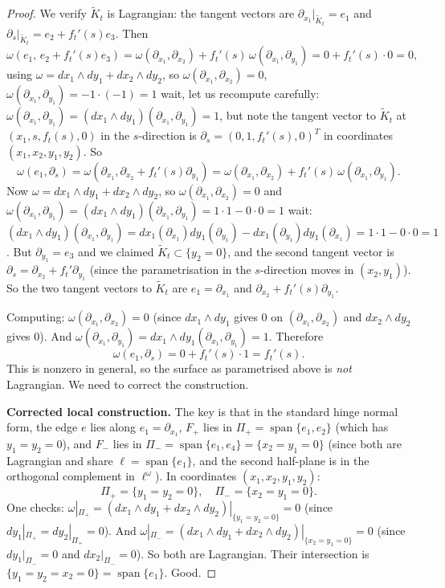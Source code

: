 \documentclass[12pt]{article}
\theoremstyle{definition}
\DeclareMathOperator{\Span}{span}
\begin{document}
\begin{proof}
We verify $\tilde{K}_t$ is Lagrangian: the tangent vectors are $\partial_{x_1}|_{\tilde{K}_t} = e_1$ and $\partial_s|_{\tilde{K}_t} = e_2 + f_t'(s) e_3$. Then
\[
  \omega(e_1,\, e_2 + f_t'(s) e_3)
  = \omega(\partial_{x_1}, \partial_{x_2}) + f_t'(s)\,\omega(\partial_{x_1}, \partial_{y_1})
  = 0 + f_t'(s) \cdot 0 = 0,
\]
using $\omega = dx_1 \wedge dy_1 + dx_2 \wedge dy_2$, so $\omega(\partial_{x_1}, \partial_{x_2}) = 0$, $\omega(\partial_{x_1}, \partial_{y_1}) = -1 \cdot (-1) = 1$ wait, let us recompute carefully:
$\omega(\partial_{x_1}, \partial_{y_1}) = (dx_1 \wedge dy_1)(\partial_{x_1}, \partial_{y_1}) = 1$, but note the tangent vector to $\tilde{K}_t$ at $(x_1, s, f_t(s), 0)$ in the $s$-direction is $\partial_s = (0, 1, f_t'(s), 0)^T$ in coordinates $(x_1, x_2, y_1, y_2)$. So
\[
  \omega(e_1, \partial_s) = \omega(\partial_{x_1}, \partial_{x_2} + f_t'(s)\partial_{y_1})
  = \omega(\partial_{x_1}, \partial_{x_2}) + f_t'(s)\,\omega(\partial_{x_1}, \partial_{y_1}).
\]
Now $\omega = dx_1\wedge dy_1 + dx_2\wedge dy_2$, so $\omega(\partial_{x_1}, \partial_{x_2}) = 0$ and $\omega(\partial_{x_1}, \partial_{y_1}) = (dx_1\wedge dy_1)(\partial_{x_1},\partial_{y_1}) = 1\cdot 1 - 0\cdot 0 = 1$ wait: $(dx_1\wedge dy_1)(\partial_{x_1},\partial_{y_1}) = dx_1(\partial_{x_1})dy_1(\partial_{y_1}) - dx_1(\partial_{y_1})dy_1(\partial_{x_1}) = 1\cdot 1 - 0\cdot 0 = 1$. But $\partial_{y_1} = e_3$ and we claimed $\tilde{K}_t \subset \{y_2=0\}$, and the second tangent vector is $\partial_s = \partial_{x_2} + f_t'\partial_{y_1}$ (since the parametrisation in the $s$-direction moves in $(x_2,y_1)$). So the two tangent vectors to $\tilde{K}_t$ are $e_1 = \partial_{x_1}$ and $\partial_{x_2} + f_t'(s)\partial_{y_1}$.

Computing: $\omega(\partial_{x_1}, \partial_{x_2}) = 0$ (since $dx_1 \wedge dy_1$ gives $0$ on $(\partial_{x_1}, \partial_{x_2})$ and $dx_2 \wedge dy_2$ gives $0$). And $\omega(\partial_{x_1}, \partial_{y_1}) = dx_1 \wedge dy_1(\partial_{x_1},\partial_{y_1}) = 1$. Therefore
\[
  \omega(e_1, \partial_s) = 0 + f_t'(s) \cdot 1 = f_t'(s).
\]
This is nonzero in general, so the surface as parametrised above is \emph{not} Lagrangian. We need to correct the construction.

\medskip
\noindent\textbf{Corrected local construction.} The key is that in the standard hinge normal form, the edge $e$ lies along $e_1 = \partial_{x_1}$, $F_+$ lies in $\Pi_+ = \Span\{e_1, e_2\}$ (which has $y_1=y_2=0$), and $F_-$ lies in $\Pi_- = \Span\{e_1, e_4\} = \{x_2 = y_1 = 0\}$ (since both are Lagrangian and share $\ell = \Span\{e_1\}$, and the second half-plane is in the orthogonal complement in $\ell^\omega$). In coordinates $(x_1,x_2,y_1,y_2)$:
\[
  \Pi_+ = \{y_1 = y_2 = 0\}, \quad \Pi_- = \{x_2 = y_1 = 0\}.
\]
One checks: $\omega|_{\Pi_+} = (dx_1\wedge dy_1 + dx_2\wedge dy_2)|_{\{y_1=y_2=0\}} = 0$ (since $dy_1|_{\Pi_+} = dy_2|_{\Pi_+} = 0$). And $\omega|_{\Pi_-} = (dx_1\wedge dy_1 + dx_2\wedge dy_2)|_{\{x_2=y_1=0\}} = 0$ (since $dy_1|_{\Pi_-} = 0$ and $dx_2|_{\Pi_-} = 0$). So both are Lagrangian. Their intersection is $\{y_1=y_2=x_2=0\} = \Span\{e_1\}$. Good.


\end{proof}
\end{document}
